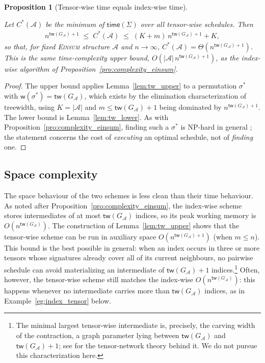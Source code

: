 \documentclass[sn-mathphys, natbib=false]{sn-jnl}
\theoremstyle{plain}
\newtheorem{proposition}{Proposition}
\theoremstyle{definition}
\def\Einsum{\textsc{Einsum}}
\newcommand{\treewidthp}[1]{\mathsf{tw}(#1)}
\newcommand{\less}{O}
\newcommand{\appequal}{\Theta}
\newif\ifshowchanges
\newcommand{\rev}[1]{%
  \ifshowchanges
    {\color{red} #1}%
  \else
    #1%
  \fi
}
\def\calA{\mathcal{A}}
\begin{document}
\begin{bibunit}[agsm]
\begin{proposition}[Tensor-wise time equals index-wise time]
\label{pro:tw_time}
\rev{Let $C^\ast(\calA)$ be the minimum of $\mathsf{time}(\Sigma)$ over all tensor-wise schedules. Then
\begin{align*}
n^{\treewidthp{G_\calA}+1} \;\le\; C^\ast(\calA) \;\le\; (K + m)\, n^{\treewidthp{G_\calA}+1} + K,
\end{align*}
so that, for fixed \Einsum{} structure $\calA$ and $n \to \infty$, $C^\ast(\calA) = \appequal(n^{\treewidthp{G_\calA}+1})$. This is the same time-complexity upper bound, $\less(|\calA|\, n^{\treewidthp{G_\calA}+1})$, as the index-wise algorithm of Proposition~\ref{pro:complexity_einsum}.}
\end{proposition}

\begin{proof}
\rev{The upper bound applies Lemma~\ref{lem:tw_upper} to a permutation $\sigma^\ast$ with $\mathsf{w}(\sigma^\ast) = \treewidthp{G_\calA}$, which exists by the elimination characterization of treewidth, using $K = |\calA|$ and $m \le \treewidthp{G_\calA}+1$ being dominated by $n^{\treewidthp{G_\calA}+1}$. The lower bound is Lemma~\ref{lem:tw_lower}. As with Proposition~\ref{pro:complexity_einsum}, finding such a $\sigma^\ast$ is NP-hard in general \citep{arnborg1987complexity}; the statement concerns the cost of \emph{executing} an optimal schedule, not of \emph{finding} one.}
\end{proof}

\subsection{Space complexity}

\rev{The space behaviour of the two schemes is less clean than their time behaviour. As noted after Proposition~\ref{pro:complexity_einsum}, the index-wise scheme stores intermediates of at most $\treewidthp{G_\calA}$ indices, so its peak working memory is $\less(n^{\treewidthp{G_\calA}})$. The construction of Lemma~\ref{lem:tw_upper} shows that the tensor-wise scheme can be run in auxiliary space $\less(n^{\treewidthp{G_\calA}+1})$ (when $m \le n$). This bound is the best possible in general: when an index occurs in three or more tensors whose signatures already cover all of its current neighbours, no pairwise schedule can avoid materializing an intermediate of $\treewidthp{G_\calA}+1$ indices.\footnote{\rev{The minimal largest tensor-wise intermediate is, precisely, the carving width of the contraction, a graph parameter lying between $\treewidthp{G_\calA}$ and $\treewidthp{G_\calA}+1$; see \citet{markov2008simulating, gray2021hyper} for the tensor-network theory behind it. We do not pursue this characterization here.}} Often, however, the tensor-wise scheme still matches the index-wise $\less(n^{\treewidthp{G_\calA}})$: this happens whenever no intermediate carries more than $\treewidthp{G_\calA}$ indices, as in Example~\ref{eg:index_tensor} below.}


\end{bibunit}
\end{document}
